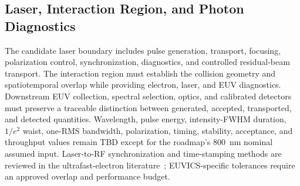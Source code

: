 \subsection{Laser, Interaction Region, and Photon Diagnostics}

The candidate laser boundary includes pulse generation, transport, focusing,
polarization control, synchronization, diagnostics, and controlled residual-beam
transport. The interaction region must establish the collision geometry and
spatiotemporal overlap while providing electron, laser, and EUV diagnostics.
Downstream EUV collection, spectral selection, optics, and calibrated detectors
must preserve a traceable distinction between generated, accepted, transported,
and detected quantities. Wavelength, pulse energy, intensity-FWHM duration,
$1/e^2$ waist, one-RMS bandwidth, polarization, timing, stability, acceptance,
and throughput values remain TBD except for the roadmap's 800~nm nominal
assumed input. Laser-to-RF synchronization and time-stamping methods are
reviewed in the ultrafast-electron literature~\cite{FilippettoEtAl2022UED};
EUVICS-specific tolerances require an approved overlap and performance budget.

\blankline
\blankline
